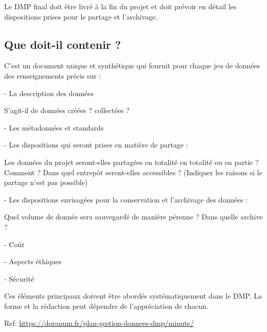 \documentclass[11pt,oneside]{article}
\begin{document}
\begin{flushleft}
Le DMP final doit être livré à la fin du projet et doit prévoir en détail les dispositions prises pour le partage et l’archivage.
\end{flushleft}

\subsection*{Que doit-il contenir ?}

\begin{flushleft}
C’est un document unique et synthétique qui fournit pour chaque jeu de données des renseignements précis sur :
\end{flushleft}

-	La description des données

\begin{flushleft}
S’agit-il de données créées ? collectées ?
\end{flushleft}

-	Les métadonnées et standards

-	Les dispositions qui seront prises en matière de partage :

\begin{flushleft}
Les données du projet seront-elles partagées en totalité en totalité ou en partie ? Comment ? Dans quel entrepôt seront-elles accessibles ? (Indiquer les raisons si le partage n’est pas possible)
\end{flushleft}

\newpage

-	Les dispositions envisagées pour la conservation et l’archivage des données :

\begin{flushleft}
Quel volume de donnée sera sauvegardé de manière pérenne ? Dans quelle archive ?
\end{flushleft}

-	Coût

-	Aspects éthiques

-	Sécurité

\begin{flushleft}
Ces éléments principaux doivent être abordés systématiquement dans le DMP. La forme et la rédaction peut dépendre de l’appréciation de chacun.
\end{flushleft}


\begin{flushleft}
Ref: \url{https://doranum.fr/plan-gestion-donnees-dmp/minute/}
\end{flushleft}
\end{document}
